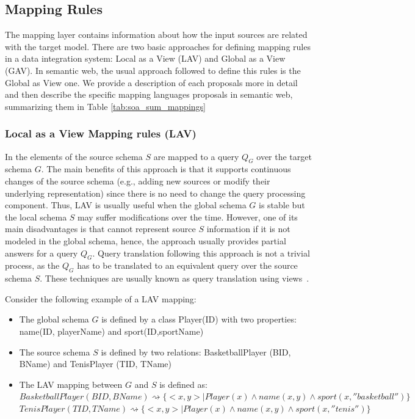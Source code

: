 \subsection{Mapping Rules}
The mapping layer contains information about how the input sources are related with the target model. There are two basic approaches for defining mapping rules in a data integration system: Local as a View (LAV) and Global as a View (GAV). In semantic web, the usual approach followed to define this rules is the Global as View one. We provide a description of each proposals more in detail and then describe the specific mapping languages proposals in semantic web, summarizing them in Table \ref{tab:soa_sum_mappings}

\subsubsection{Local as a View Mapping rules (LAV)}
In \citep{ullman1997information} the elements of the source schema $S$ are mapped  to a query $Q_G$ over the target schema $G$. The main benefits of this approach is that it supports continuous changes of the source schema (e.g., adding new sources or modify their underlying representation) since there is no need to change the query processing component. Thus, LAV is usually useful when the global schema $G$ is stable but the local schema $S$ may suffer modifications over the time. However, one of its main disadvantages is that cannot represent source $S$ information if it is not modeled in the global schema, hence, the approach usually provides partial answers for a query $Q_G$. Query translation following this approach is not a trivial process, as the $Q_G$ has to be translated to an equivalent query over the source schema $S$. These techniques are usually known as query translation using views~\citep{halevy2001answering}.

Consider the following example of a LAV mapping:
\begin{itemize}
    \item The global schema $G$ is defined by a class Player(ID) with two properties: name(ID, playerName) and sport(ID,sportName)
    \item The source schema $S$ is defined by two relations: BasketballPlayer (BID, BName) and TenisPlayer (TID, TName)
    \item The LAV mapping between $G$ and $S$ is defined as:\\
    $BasketballPlayer(BID,BName) \rightsquigarrow \{<x,y>|Player(x)\wedge name(x,y) \wedge sport(x,''basketball'')\}$\\
    $TenisPlayer(TID,TName) \rightsquigarrow \{<x,y>|Player(x)\wedge name(x,y) \wedge sport(x,''tenis'')\}$
\end{itemize}

